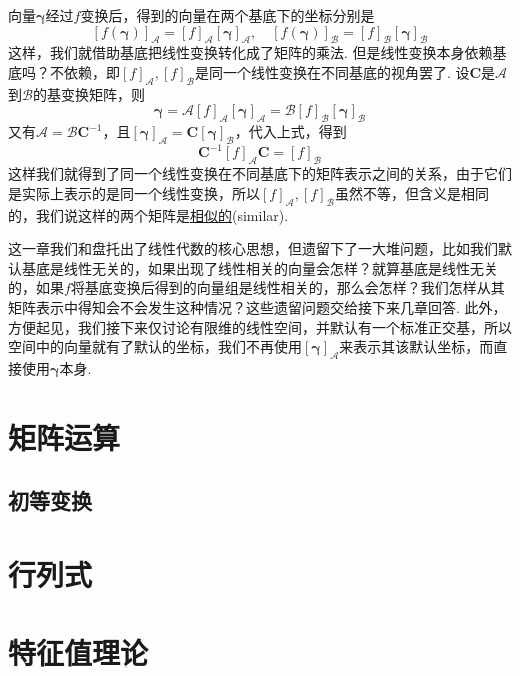 \documentclass[main.tex]{subfiles}
\begin{document}
向量\(\bm\gamma\)经过\(f\)变换后，得到的向量在两个基底下的坐标分别是
\[[f(\bm\gamma)]_\mathcal{A} = [f]_\mathcal{A}[\bm\gamma]_\mathcal{A}, \quad [f(\bm\gamma)]_\mathcal{B} = [f]_\mathcal{B}[\bm\gamma]_\mathcal{B}\]
这样，我们就借助基底把线性变换转化成了矩阵的乘法. 但是线性变换本身依赖基底吗？不依赖，即\([f]_\mathcal{A},[f]_\mathcal{B}\)是同一个线性变换在不同基底的视角罢了. 设\(\bm C\)是\(\mathcal{A}\)到\(\mathcal{B}\)的基变换矩阵，则
\[\bm\gamma = \mathcal{A}[f]_\mathcal{A}[\bm\gamma]_\mathcal{A} = \mathcal{B}[f]_\mathcal{B}[\bm\gamma]_\mathcal{B}\]
又有\(\mathcal{A} = \mathcal{B}\bm{C}^{-1}\)，且\([\bm\gamma]_\mathcal{A} = \bm{C}[\bm\gamma]_{\mathcal{B}}\)，代入上式，得到
\[\bm{C}^{-1}[f]_\mathcal{A}\bm{C} = [f]_\mathcal{B}\]
这样我们就得到了同一个线性变换在不同基底下的矩阵表示之间的关系，由于它们是实际上表示的是同一个线性变换，所以\([f]_\mathcal{A},[f]_\mathcal{B}\)虽然不等，但含义是相同的，我们说这样的两个矩阵是\uline{相似的}(similar). 


这一章我们和盘托出了线性代数的核心思想，但遗留下了一大堆问题，比如我们默认基底是线性无关的，如果出现了线性相关的向量会怎样？就算基底是线性无关的，如果\(f\)将基底变换后得到的向量组是线性相关的，那么会怎样？我们怎样从其矩阵表示中得知会不会发生这种情况？这些遗留问题交给接下来几章回答. 此外，方便起见，我们接下来仅讨论有限维的线性空间，并默认有一个标准正交基，所以空间中的向量就有了默认的坐标，我们不再使用\([\bm\gamma]_\mathcal{A}\)来表示其该默认坐标，而直接使用\(\bm\gamma\)本身.

\section{矩阵运算}

\subsection{初等变换}


\section{行列式}

\section{特征值理论}
\end{document}

